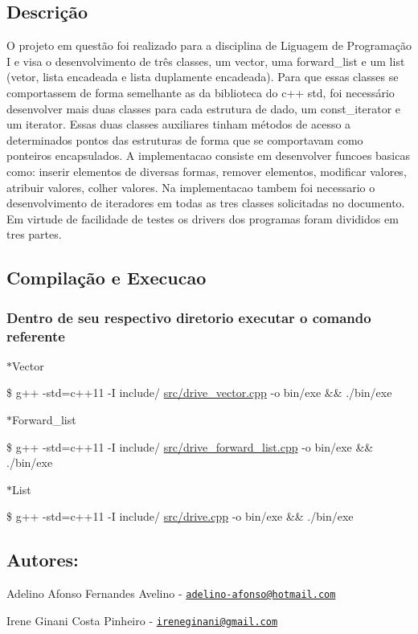 \subsection*{Descrição}

\begin{DoxyVerb}O projeto em questão foi realizado para a disciplina de Liguagem de Programação I e visa o desenvolvimento de três classes, um vector, uma forward_list e um list (vetor, lista encadeada e lista duplamente encadeada). Para que essas classes se comportassem de forma semelhante as da biblioteca do c++ std, foi necessário desenvolver mais duas classes para cada estrutura de dado, um const_iterator e um iterator. Essas duas classes auxiliares tinham métodos de acesso a determinados pontos das estruturas de forma que se comportavam como ponteiros encapsulados.
A implementacao consiste em desenvolver funcoes basicas como: inserir elementos de diversas formas, remover elementos, modificar valores, atribuir valores, colher valores. Na implementacao tambem foi necessario o desenvolvimento de iteradores em todas as tres classes solicitadas no documento. Em virtude de facilidade de testes os drivers dos programas foram divididos em tres partes.
\end{DoxyVerb}


\subsection*{Compilação e Execucao}

\subsubsection*{Dentro de seu respectivo diretorio executar o comando referente}

$\ast$\+Vector

\$ g++ -\/std=c++11 -\/I include/ \hyperlink{drive__vector_8cpp}{src/drive\+\_\+vector.\+cpp} -\/o bin/exe \&\& ./bin/exe

$\ast$\+Forward\+\_\+list

\$ g++ -\/std=c++11 -\/I include/ \hyperlink{drive__forward__list_8cpp}{src/drive\+\_\+forward\+\_\+list.\+cpp} -\/o bin/exe \&\& ./bin/exe

$\ast$\+List

\$ g++ -\/std=c++11 -\/I include/ \hyperlink{drive_8cpp}{src/drive.\+cpp} -\/o bin/exe \&\& ./bin/exe

\subsection*{Autores\+:}


\begin{DoxyItemize}
\item Adelino Afonso Fernandes Avelino -\/ \href{mailto:adelino-afonso@hotmail.com}{\tt adelino-\/afonso@hotmail.\+com}
\item Irene Ginani Costa Pinheiro -\/ \href{mailto:ireneginani@gmail.com}{\tt ireneginani@gmail.\+com} 
\end{DoxyItemize}